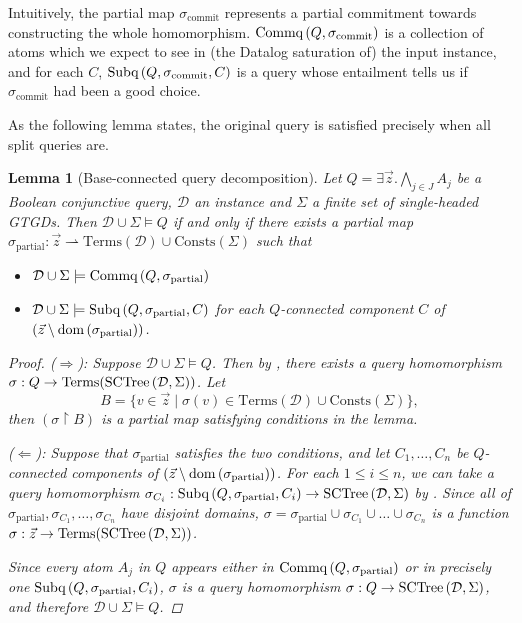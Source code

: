 \documentclass[12pt]{report}
\theoremstyle{plain}
\newtheorem{lemma}[theorem]{Lemma}
\theoremstyle{definition}
\def\Consts{{\mathrm{Consts}}}
\def\Terms{{\mathrm{Terms}}}
\newcommand{\dom}[1]{\ensuremath{\normalfont{\operatorname{dom}} \left( #1 \right)}}
\newcommand{\SCTree}[2]{\ensuremath{\normalfont{\textrm{SCTree}} \left( #1, #2 \right)}}
\newcommand{\Subq}[3]{\ensuremath{\normalfont{\textrm{Subq}} \left( #1, #2, #3 \right)}}
\newcommand{\Commq}[2]{\ensuremath{\normalfont{\textrm{Commq}} \left( #1, #2 \right)}}
\begin{document}
Intuitively, the partial map $\sigma_\mathrm{commit}$ represents a partial commitment towards constructing the whole homomorphism. $\Commq{Q}{\sigma_\mathrm{commit}}$ is a collection of atoms which we expect to see in (the Datalog saturation of) the input instance, and for each $C$, $\Subq{Q}{\sigma_\mathrm{commit}}{C}$ is a query whose entailment tells us if $\sigma_\mathrm{commit}$ had been a good choice.

As the following lemma states, the original query is satisfied precisely when all split queries are.

\begin{lemma}[Base-connected query decomposition]
\label{bcq-base-connected-query-decomposition}
  Let $Q = \exists \vec{z}. \bigwedge_{j \in J} A_j$ be a Boolean conjunctive query, $\mathcal{D}$ an instance and $\Sigma$ a finite set of single-headed GTGDs. Then $\mathcal{D} \cup \Sigma \models Q$ if and only if there exists a partial map $\sigma_\mathrm{partial}: \vec{z} \rightharpoonup \Terms(\mathcal{D}) \cup \Consts(\Sigma)$ such that
  \begin{itemize}
    \item $\mathcal{D} \cup \Sigma \models \Commq{Q}{\sigma_\mathrm{partial}}$
    \item $\mathcal{D} \cup \Sigma \models \Subq{Q}{\sigma_\mathrm{partial}}{C}$ for each $Q$-connected component $C$ of \newline $(\vec{z} \setminus\nobreak \mathrm{\dom{\sigma_\mathrm{partial}}})$.
  \end{itemize}
  \begin{proof}
    ($\Longrightarrow$): Suppose $\mathcal{D} \cup \Sigma \models Q$. Then by , there exists a query homomorphism $\sigma: Q \rightarrow \Terms(\SCTree{\mathcal{D}}{\Sigma})$. Let $$B = \{ v \in \vec{z} \mid \sigma(v) \in \Terms(\mathcal{D}) \cup \Consts(\Sigma) \},$$ then $(\sigma \upharpoonright B)$ is a partial map satisfying conditions in the lemma.

    ($\Longleftarrow$): Suppose that $\sigma_\mathrm{partial}$ satisfies the two conditions, and let $C_1, \ldots, C_n$ be $Q$-connected components of $(\vec{z} \setminus\nobreak \mathrm{\dom{\sigma_\mathrm{partial}}})$. For each $1 \leq i \leq n$, we can take a query homomorphism $\sigma_{C_i}: \Subq{Q}{\sigma_\mathrm{partial}}{C_i} \rightarrow \SCTree{\mathcal{D}}{\Sigma}$ by . Since all of $\sigma_\mathrm{partial}, \sigma_{C_1}, \ldots, \sigma_{C_n}$ have disjoint domains, $\sigma = \sigma_\mathrm{partial} \cup \sigma_{C_1} \cup \ldots \cup \sigma_{C_n}$ is a function $\sigma: \vec{z} \rightarrow \Terms(\SCTree{\mathcal{D}}{\Sigma})$.
    
    Since every atom $A_j$ in $Q$ appears either in $\Commq{Q}{\sigma_\mathrm{partial}}$ or in precisely one $\Subq{Q}{\sigma_\mathrm{partial}}{C_i}$, $\sigma$ is a query homomorphism $\sigma: Q \rightarrow \SCTree{\mathcal{D}}{\Sigma}$, and therefore $\mathcal{D} \cup \Sigma \models Q$.
  \end{proof}
\end{lemma}
\end{document}
